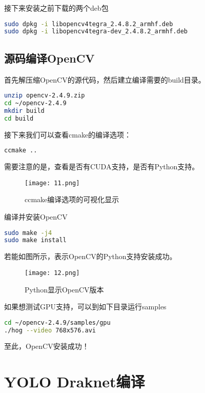 \documentclass[openany]{ctexbook}
\begin{document}
接下来安装之前下载的两个deb包
{\setmainfont{Courier New Bold}                          %
\begin{lstlisting}[language=bash]
sudo dpkg -i libopencv4tegra_2.4.8.2_armhf.deb
sudo dpkg -i libopencv4tegra-dev_2.4.8.2_armhf.deb
\end{lstlisting}}

\section{源码编译OpenCV}
首先解压缩OpenCV的源代码，然后建立编译需要的build目录。
{\setmainfont{Courier New Bold}                          %
\begin{lstlisting}[language=bash]
unzip opencv-2.4.9.zip
cd ~/opencv-2.4.9
mkdir build
cd build
\end{lstlisting}}
接下来我们可以查看cmake的编译选项：
{\setmainfont{Courier New Bold}                          %
\begin{lstlisting}[language=bash]
ccmake ..
\end{lstlisting}}
需要注意的是，查看是否有CUDA支持，是否有Python支持。
\begin{figure}[h]
  \centering
  \texttt{[image: 11.png]}
  \caption{ccmake编译选项的可视化显示}
\end{figure}

编译并安装OpenCV
{\setmainfont{Courier New Bold}                          %
\begin{lstlisting}[language=bash]
sudo make -j4
sudo make install
\end{lstlisting}}

若能如图所示，表示OpenCV的Python支持安装成功。
\begin{figure}[h]
  \centering
  \texttt{[image: 12.png]}
  \caption{Python显示OpenCV版本}
\end{figure}

如果想测试GPU支持，可以到如下目录运行samples
{\setmainfont{Courier New Bold}                          %
\begin{lstlisting}[language=bash]
cd ~/opencv-2.4.9/samples/gpu
./hog --video 768x576.avi
\end{lstlisting}}

至此，OpenCV安装成功！

\chapter{YOLO Draknet编译}
\end{document}
